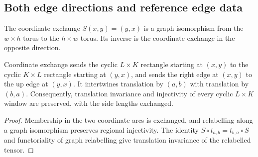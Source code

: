 \subsection{Both edge directions and reference edge data}
\label{subsec:peps_arc_window_gauge}

\begin{definition}%
    \label{def:peps_torus_coordinate_swap}
    \leanok
    The coordinate exchange $S(x,y)=(y,x)$ is a graph isomorphism from
    the $w\times h$ torus to the $h\times w$ torus. Its inverse is the
    coordinate exchange in the opposite direction.
\end{definition}

\begin{lemma}%
    \label{thm:peps_torus_coordinate_swap_windows}
    \leanok
    Coordinate exchange sends the cyclic $L\times K$ rectangle starting
    at $(x,y)$ to the cyclic $K\times L$ rectangle starting at $(y,x)$,
    and sends the right edge at $(x,y)$ to the up edge at $(y,x)$.
    It intertwines translation by $(a,b)$ with translation by $(b,a)$.
    Consequently, translation invariance and injectivity of every
    cyclic $L\times K$ window are preserved, with the side lengths
    exchanged.
\end{lemma}
\begin{proof}
    \leanok
    Membership in the two coordinate arcs is exchanged, and relabelling
    along a graph isomorphism preserves regional injectivity. The identity
    $S\circ t_{a,b}=t_{b,a}\circ S$ and functoriality of graph relabelling
    give translation invariance of the relabelled tensor.
\end{proof}

